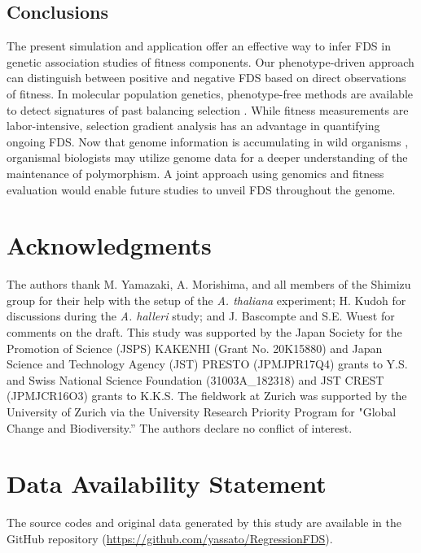 \documentclass[12pt,]{article}
\begin{document}
\subsection{Conclusions}
The present simulation and application offer an effective way to infer FDS in genetic association studies of fitness components. Our phenotype-driven approach can distinguish between positive and negative FDS based on direct observations of fitness. In molecular population genetics, phenotype-free methods are available to detect signatures of past balancing selection \citep{siewert_detecting_2017}. While fitness measurements are labor-intensive, selection gradient analysis has an advantage in quantifying ongoing FDS. Now that genome information is accumulating in wild organisms \citep{lewin2018earth}, organismal biologists may utilize genome data for a deeper understanding of the maintenance of polymorphism. A joint approach using genomics and fitness evaluation would enable future studies to unveil FDS throughout the genome.

\section*{Acknowledgments}
The authors thank M. Yamazaki, A. Morishima, and all members of the Shimizu group for their help with the setup of the \textit{A. thaliana} experiment; H. Kudoh for discussions during the \textit{A. halleri} study; and J. Bascompte and S.E. Wuest for comments on the draft. This study was supported by the Japan Society for the Promotion of Science (JSPS) KAKENHI (Grant No. 20K15880) and Japan Science and Technology Agency (JST) PRESTO (JPMJPR17Q4) grants to Y.S. and Swiss National Science Foundation (31003A\_182318) and JST CREST (JPMJCR16O3) grants to K.K.S. The fieldwork at Zurich was supported by the University of Zurich via the University Research Priority Program for "Global Change and Biodiversity.” The authors declare no conflict of interest.

\section*{Data Availability Statement}
The source codes and original data generated by this study are available in the GitHub repository (\url{https://github.com/yassato/RegressionFDS}).

\renewcommand\refname{References}

\newpage
\end{document}
